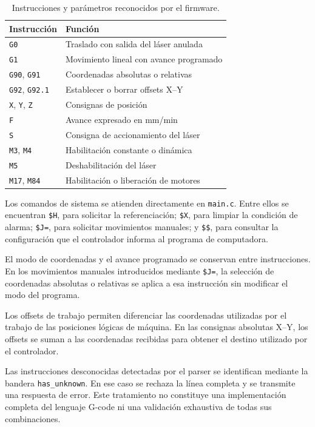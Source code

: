 \documentclass[blue,fullpaper]{ludusofficial}  %
\begin{document}
\begin{table}[htbp]
    \centering
    \small
    \caption{Instrucciones y parámetros reconocidos
    por el firmware.}
    \label{tab:gcode-admitido}
    \begin{tabular}{ll}
        \hline
        Instrucción & Función \\
        \hline
        \texttt{G0} & Traslado con salida del láser anulada \\
        \texttt{G1} & Movimiento lineal con avance programado \\
        \texttt{G90}, \texttt{G91} & Coordenadas absolutas o relativas \\
        \texttt{G92}, \texttt{G92.1} & Establecer o borrar offsets X--Y \\
        \texttt{X}, \texttt{Y}, \texttt{Z} & Consignas de posición \\
        \texttt{F} & Avance expresado en mm/min \\
        \texttt{S} & Consigna de accionamiento del láser \\
        \texttt{M3}, \texttt{M4} & Habilitación constante o dinámica \\
        \texttt{M5} & Deshabilitación del láser \\
        \texttt{M17}, \texttt{M84} & Habilitación o liberación de motores \\
        \hline
    \end{tabular}
\end{table}

Los comandos de sistema se atienden directamente
en \texttt{main.c}. Entre ellos se encuentran
\texttt{\$H}, para solicitar la referenciación;
\texttt{\$X}, para limpiar la condición de alarma;
\texttt{\$J=}, para solicitar movimientos manuales;
y \texttt{\$\$}, para consultar la configuración
que el controlador informa al programa de computadora.

El modo de coordenadas y el avance programado se conservan
entre instrucciones. En los movimientos manuales
introducidos mediante \texttt{\$J=}, la selección
de coordenadas absolutas o relativas se aplica
a esa instrucción sin modificar el modo del programa.

Los offsets de trabajo permiten diferenciar las
coordenadas utilizadas por el trabajo de las posiciones
lógicas de máquina. En las consignas absolutas X--Y,
los offsets se suman a las coordenadas recibidas
para obtener el destino utilizado por el controlador.

Las instrucciones desconocidas detectadas por el parser
se identifican mediante la bandera \texttt{has\_unknown}.
En ese caso se rechaza la línea completa y se transmite
una respuesta de error. Este tratamiento no constituye
una implementación completa del lenguaje G-code ni
una validación exhaustiva de todas sus combinaciones.
\end{document}
